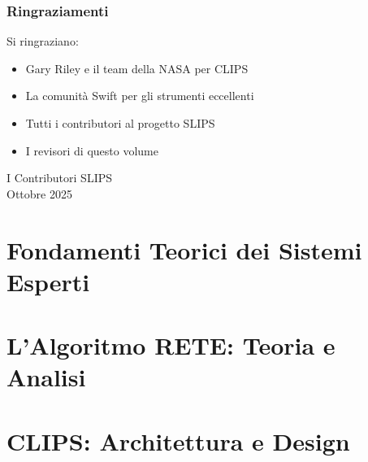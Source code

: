 \documentclass[12pt,a4paper,twoside,openright]{book}
\theoremstyle{definition}
\theoremstyle{remark}
\begin{document}
\section*{Ringraziamenti}

Si ringraziano:
\begin{itemize}
\item Gary Riley e il team della NASA per CLIPS
\item La comunità Swift per gli strumenti eccellenti
\item Tutti i contributori al progetto SLIPS
\item I revisori di questo volume
\end{itemize}

\vspace{1cm}
\begin{flushright}
I Contributori SLIPS\\
Ottobre 2025
\end{flushright}

\tableofcontents
\listoffigures
\listoftables
\lstlistoflistings

\mainmatter

\part{Fondamenti Teorici dei Sistemi Esperti}






\part{L'Algoritmo RETE: Teoria e Analisi}








\part{CLIPS: Architettura e Design}






\end{document}
